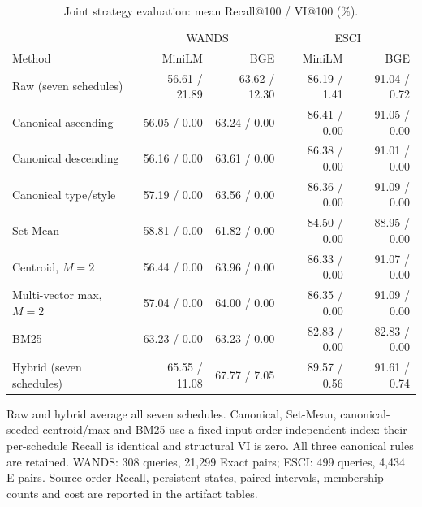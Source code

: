 \begin{table}[t]
\centering
\small
\setlength{\tabcolsep}{4pt}
\caption{Joint strategy evaluation: mean Recall@100 / VI@100 (\%).}
\label{tab:strategy_joint}
\begin{tabular}{lrrrr}
\toprule
 & \multicolumn{2}{c}{WANDS} & \multicolumn{2}{c}{ESCI} \\
Method & MiniLM & BGE & MiniLM & BGE \\
\midrule
Raw (seven schedules) & 56.61 / 21.89 & 63.62 / 12.30 & 86.19 / 1.41 & 91.04 / 0.72 \\
Canonical ascending & 56.05 / 0.00 & 63.24 / 0.00 & 86.41 / 0.00 & 91.05 / 0.00 \\
Canonical descending & 56.16 / 0.00 & 63.61 / 0.00 & 86.38 / 0.00 & 91.01 / 0.00 \\
Canonical type/style & 57.19 / 0.00 & 63.56 / 0.00 & 86.36 / 0.00 & 91.09 / 0.00 \\
Set-Mean & 58.81 / 0.00 & 61.82 / 0.00 & 84.50 / 0.00 & 88.95 / 0.00 \\
Centroid, $M=2$ & 56.44 / 0.00 & 63.96 / 0.00 & 86.33 / 0.00 & 91.07 / 0.00 \\
Multi-vector max, $M=2$ & 57.04 / 0.00 & 64.00 / 0.00 & 86.35 / 0.00 & 91.09 / 0.00 \\
BM25 & 63.23 / 0.00 & 63.23 / 0.00 & 82.83 / 0.00 & 82.83 / 0.00 \\
Hybrid (seven schedules) & 65.55 / 11.08 & 67.77 / 7.05 & 89.57 / 0.56 & 91.61 / 0.74 \\
\bottomrule
\end{tabular}
\par\smallskip\begin{minipage}{\linewidth}\small Raw and hybrid average all seven schedules. Canonical, Set-Mean, canonical-seeded centroid/max and BM25 use a fixed input-order independent index: their per-schedule Recall is identical and structural VI is zero. All three canonical rules are retained. WANDS: 308 queries, 21,299 Exact pairs; ESCI: 499 queries, 4,434 E pairs. Source-order Recall, persistent states, paired intervals, membership counts and cost are reported in the artifact tables.\end{minipage}
\end{table}
